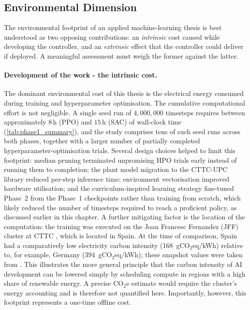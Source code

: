 \subsection{Environmental Dimension}

The environmental footprint of an applied machine-learning thesis is best understood as two opposing contributions: an \emph{intrinsic} cost caused while developing the controller, and an \emph{extrinsic} effect that the controller could deliver if deployed. A meaningful assessment must weigh the former against the latter.

\paragraph{Development of the work - the intrinsic cost.} The dominant environmental cost of this thesis is the electrical energy consumed during training and hyperparameter optimisation. The cumulative computational effort is not negligible. A single seed run of $4{,}000{,}000$ timesteps requires between approximately $8$\,h (PPO) and $15$\,h (SAC) of wall-clock time (\autoref{tab:phase1_summary}), and the study comprises tens of such seed runs across both phases, together with a larger number of partially completed hyperparameter-optimisation trials. Several design choices helped to limit this footprint: median pruning terminated unpromising \ac{HPO} trials early instead of running them to completion; the plant model migration to the CTTC-UPC library reduced per-step inference time; environment vectorisation improved hardware utilisation; and the curriculum-inspired learning strategy fine-tuned Phase~2 from the Phase~1 checkpoints rather than training from scratch, which likely reduced the number of timesteps required to reach a proficient policy, as discussed earlier in this chapter. A further mitigating factor is the location of the computation: the training was executed on the Joan Francesc Fernandez (JFF) cluster at CTTC \cite{centre_tecnologic_de_transferencia_de_calor_cttc-upc_heat_2026}, which is located in Spain. At the time of comparison, Spain had a comparatively low electricity carbon intensity (168~gCO$_2$eq/kWh) relative to, for example, Germany (394~gCO$_2$eq/kWh); these snapshot values were taken from \cite{electricity_maps_live_2026}. This illustrates the more general principle that the carbon intensity of \ac{AI} development can be lowered simply by scheduling compute in regions with a high share of renewable energy. A precise $\mathrm{CO}_2$e estimate would require the cluster's energy accounting and is therefore not quantified here. Importantly, however, this footprint represents a one-time offline cost.

